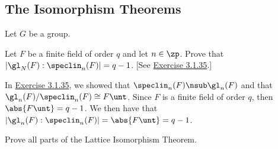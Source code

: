 \newpage

\subsection{The Isomorphism Theorems}

Let $G$ be a group.

\begin{exercise}\label{ex3.3.1}
    Let $F$ be a finite field of order $q$ and let $n \in \zp$. Prove that $|\gl_N(F) : \speclin_n(F)| = q - 1$. [See \hyperref[ex3.1.35]{Exercise 3.1.35}.]
\end{exercise}

\begin{sol}
    In \hyperref[ex3.1.35]{Exercise 3.1.35}, we showed that $\speclin_n(F) \nsub \gl_n(F)$ and that $\gl_n(F)/\speclin_n(F) \cong F\unt$. Since $F$ is a finite field of order $q$, then $\abs{F\unt} = q - 1$. We then have that $|\gl_n(F) : \speclin_n(F)| = \abs{F\unt} = q - 1$.
\end{sol}

\begin{specialexercise}\label{ex3.3.2}
    Prove all parts of the Lattice Isomorphism Theorem.
\end{specialexercise}

